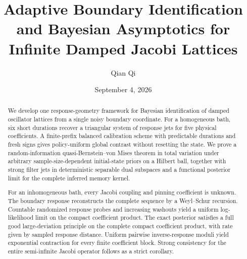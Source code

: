 \documentclass[11pt,reqno]{amsart}
\title[Adaptive boundary identification]{Adaptive Boundary Identification and Bayesian Asymptotics for Infinite Damped Jacobi Lattices}
\author{Qian Qi}
\date{September 4, 2026}
\begin{document}
\begin{abstract}
We develop one response-geometry framework for Bayesian identification of
damped oscillator lattices from a single noisy boundary coordinate.  For a
homogeneous bath, six short durations recover a triangular system of response
jets for five physical coefficients.  A finite-prefix balanced calibration
scheme with predictable durations and fresh signs gives policy-uniform global
contrast without resetting the state.  We prove a random-information
quasi-Bernstein--von Mises theorem in total variation under arbitrary
sample-size-dependent initial-state priors on a Hilbert ball, together with
strong filter jets in deterministic separable dual subspaces and a functional
posterior limit for the complete inferred memory kernel.

For an inhomogeneous bath, every Jacobi coupling and pinning coefficient is
unknown.  The boundary response reconstructs the complete sequence by a
Weyl--Schur recursion.  Countable randomized response probes and increasing
washouts yield a uniform log-likelihood limit on the compact coefficient
product.  The exact posterior satisfies a full good large-deviation principle on the
complete compact coefficient product, with rate given by sampled response
distance.  Uniform pairwise inverse-response moduli yield exponential
contraction for every finite coefficient block.  Strong consistency for the
entire semi-infinite Jacobi operator follows as a strict corollary.
\end{abstract}

\maketitle
\tableofcontents








\appendix


\end{document}
